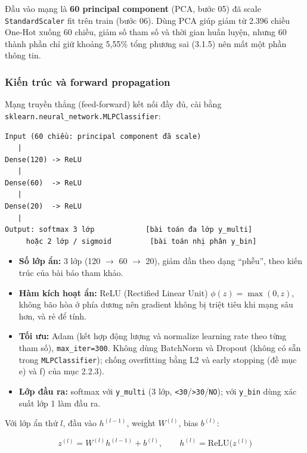 \documentclass[a4paper]{report}
\begin{document}
Đầu vào mạng là \textbf{60 principal component} (PCA, bước 05) đã scale \texttt{StandardScaler} fit trên train (bước 06). Dùng PCA giúp giảm từ 2.396 chiều One-Hot xuống 60 chiều, giảm số tham số và thời gian huấn luyện, nhưng 60 thành phần chỉ giữ khoảng 5,55\% tổng phương sai (3.1.5) nên mất một phần thông tin.

\subsubsection{Kiến trúc và forward propagation}

Mạng truyền thẳng (feed-forward) kết nối đầy đủ, cài bằng \texttt{sklearn.\allowbreak{}neural\_\allowbreak{}network.\allowbreak{}MLPClassifier}:

{\scriptsize
\begin{verbatim}
Input (60 chiều: principal component đã scale)
   |
Dense(120) -> ReLU
   |
Dense(60)  -> ReLU
   |
Dense(20)  -> ReLU
   |
Output: softmax 3 lớp            [bài toán đa lớp y_multi]
     hoặc 2 lớp / sigmoid         [bài toán nhị phân y_bin]
\end{verbatim}
}

\begin{itemize}
  \item \textbf{Số lớp ẩn:} 3 lớp (120 $\rightarrow$ 60 $\rightarrow$ 20), giảm dần theo dạng “phễu”, theo kiến trúc của bài báo tham khảo.
  \item \textbf{Hàm kích hoạt ẩn:} ReLU (Rectified Linear Unit) $\phi(z) = \max(0, z)$, không bão hòa ở phía dương nên gradient không bị triệt tiêu khi mạng sâu hơn, và rẻ để tính.
  \item \textbf{Tối ưu:} Adam (kết hợp động lượng và normalize learning rate theo từng tham số), \texttt{max\_\allowbreak{}iter=300}. Không dùng BatchNorm và Dropout (không có sẵn trong \texttt{MLPClassifier}); chống overfitting bằng L2 và early stopping (đề mục e) và f) của mục 2.2.3).
  \item \textbf{Lớp đầu ra:} softmax với \texttt{y\_\allowbreak{}multi} (3 lớp, \texttt{<30}/\texttt{>30}/\texttt{NO}); với \texttt{y\_\allowbreak{}bin} dùng xác suất lớp 1 làm đầu ra.
\end{itemize}

Với lớp ẩn thứ $l$, đầu vào $h^{(l-1)}$, weight $W^{(l)}$, bias $b^{(l)}$:

\begin{equation}
  z^{(l)} = W^{(l)} h^{(l-1)} + b^{(l)}, \qquad h^{(l)} = \text{ReLU}\big(z^{(l)}\big)
\end{equation}
\end{document}
